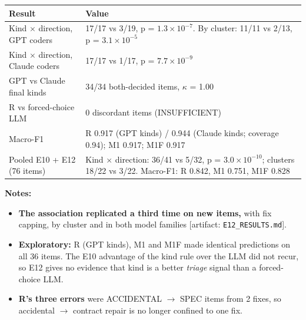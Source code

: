 \documentclass[acmsmall,screen,review,anonymous]{acmart}
\newcommand{\artifact}[1]{{\footnotesize [artifact: #1]}}
\begin{document}
\begin{table}[t]
\small
\begin{tabularx}{\linewidth}{lX}
\toprule
Result & Value \\
\midrule
Kind $\times$ direction, GPT coders & 17/17 vs 3/19, p = $1.3 \times 10^{-7}$. By cluster: 11/11 vs 2/13, p = $3.1 \times 10^{-5}$ \\
Kind $\times$ direction, Claude coders & 17/17 vs 1/17, p = $7.7 \times 10^{-9}$ \\
GPT vs Claude final kinds & 34/34 both-decided items, $\kappa$ = 1.00 \\
R vs forced-choice LLM & 0 discordant items (INSUFFICIENT) \\
Macro-F1 & R 0.917 (GPT kinds) / 0.944 (Claude kinds; coverage 0.94); M1 0.917; M1F 0.917 \\
Pooled E10 + E12 (76 items) & Kind $\times$ direction: 36/41 vs 5/32, p = $3.0 \times 10^{-10}$; clusters 18/22 vs 3/22. Macro-F1: R 0.842, M1 0.751, M1F 0.828 \\
\bottomrule
\end{tabularx}
\end{table}

\textbf{Notes:}
\begin{itemize}
\item \textbf{The association replicated a third time on new items,} with fix capping, by cluster and in both model families \artifact{\texttt{E12\_RESULTS.md}}.
\item \textbf{Exploratory:} R (GPT kinds), M1 and M1F made identical predictions on all 36 items. The E10 advantage of the kind rule over the LLM did not recur, so E12 gives no evidence that kind is a better \emph{triage} signal than a forced-choice LLM.
\item \textbf{R's three errors} were ACCIDENTAL $\rightarrow$ SPEC items from 2 fixes, so accidental $\rightarrow$ contract repair is no longer confined to one fix.
\end{itemize}
\end{document}
